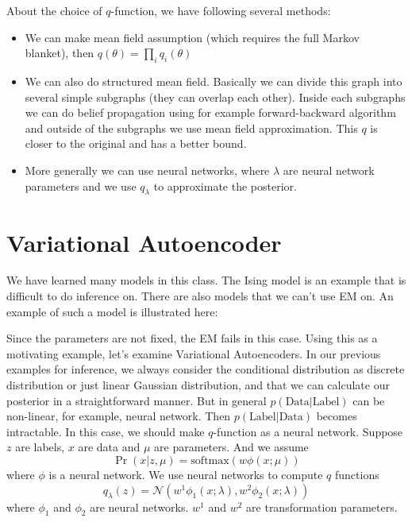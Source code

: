 \documentclass{article}
\begin{document}
About the choice of $q$-function, we have following several methods:
\begin{itemize}
\item We can make mean field assumption (which requires the full Markov blanket), then $q(\theta) = \prod_i q_i(\theta)$
\item We can also do structured mean field. Basically we can divide this graph into several simple subgraphs (they can overlap each other). Inside each subgraphs we can do belief propagation using for example forward-backward algorithm and outside of the subgraphs we use mean field approximation. This $q$ is closer to the original and has a better bound.
\item More generally we can use neural networks, where $\lambda$ are neural network parameters and we use $q_\lambda$ to approximate the posterior. 
\end{itemize}
\section{Variational Autoencoder}
We have learned many models in this class. The Ising model is an example that is difficult to do inference on. There are also models that we can't use EM on. An example of such a model is illustrated here: \\

\begin{center}
\end{center}
Since the parameters are not fixed, the EM fails in this case. Using this as a motivating example, let's examine Variational Autoencoders. In our previous examples for inference, we always consider the conditional distribution as discrete distribution or just linear Gaussian distribution, and that we can calculate our posterior in a straightforward manner. But in general $p(\textrm{Data}|\textrm{Label})$ can be non-linear, for example, neural network. Then $p(\textrm{Label}|\textrm{Data})$ becomes intractable. In this case, we should make $q$-function as a neural network. Suppose $z$ are labels, $x$ are data and $\mu$ are parameters. 
And we assume
$$\Pr(x | z, \mu) = \textrm{softmax}(w\phi(x; \mu))$$
where $\phi$ is a neural network. We use neural networks to compute $q$ functions
$$ q_{\lambda}(z) = \mathcal{N}(w^1\phi_1(x; \lambda), w^2\phi_2(x; \lambda)) $$
where $\phi_1$ and $\phi_2$ are neural networks. $w^1$ and $w^2$ are transformation parameters. 
\end{document}

